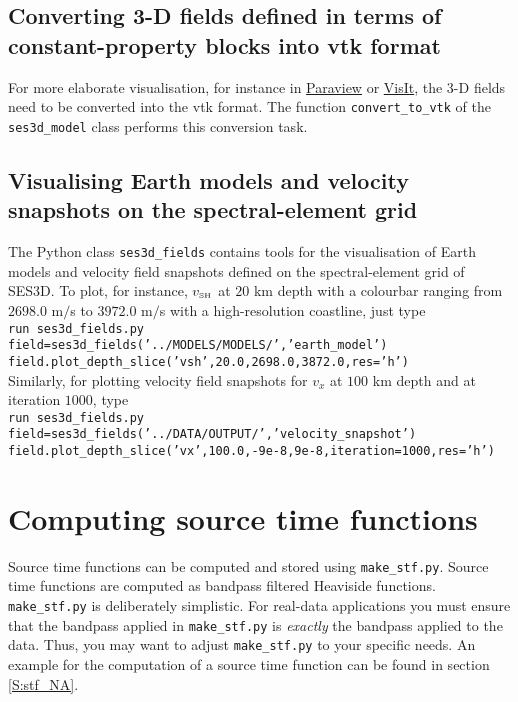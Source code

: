 \subsection{Converting 3-D fields defined in terms of constant-property blocks into vtk format}

For more elaborate visualisation, for instance in \href{www.paraview.org}{Paraview} or \href{https://wci.llnl.gov/codes/visit/}{VisIt}, the 3-D fields need to be converted into the vtk format. The function \texttt{convert\_to\_vtk} of the \texttt{ses3d\_model} class performs this conversion task.

\subsection{Visualising Earth models and velocity snapshots on the spectral-element grid}

The Python class \texttt{ses3d\_fields} contains tools for the visualisation of Earth models and velocity field snapshots defined on the spectral-element grid of SES3D. To plot, for instance, $v_\text{\tiny{SH}}$ at $20$ km depth with a colourbar ranging from $2698.0$ m$/$s to $3972.0$ m$/$s with a high-resolution coastline, just type\\[5pt]
\texttt{run ses3d\_fields.py\\
field=ses3d\_fields('../MODELS/MODELS/','earth\_model')\\
field.plot\_depth\_slice('vsh',20.0,2698.0,3872.0,res='h')}\\[5pt]
Similarly, for plotting velocity field snapshots for $v_x$ at $100$ km depth and at iteration $1000$, type\\[5pt]
\texttt{run ses3d\_fields.py\\
field=ses3d\_fields('../DATA/OUTPUT/','velocity\_snapshot')\\
field.plot\_depth\_slice('vx',100.0,-9e-8,9e-8,iteration=1000,res='h')}\\


\section{Computing source time functions}

Source time functions can be computed and stored using \texttt{make\_stf.py}. Source time functions are computed as bandpass filtered Heaviside functions. \texttt{make\_stf.py} is deliberately simplistic. For real-data applications you must ensure that the bandpass applied in \texttt{make\_stf.py} is \emph{exactly} the bandpass applied to the data. Thus, you may want to adjust \texttt{make\_stf.py} to your specific needs. An example for the computation of a source time function can be found in section \ref{S:stf_NA}.


